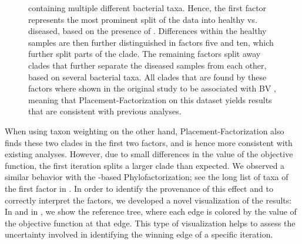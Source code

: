 \begin{figure}[!htbp]
{        containing multiple different bacterial taxa.
        Hence, the first factor represents the most prominent split of the data into healthy vs. diseased,
        based on the presence of .
        Differences within the healthy samples are then further distinguished in factors five and ten,
        which further split parts of the  clade.
        The remaining factors split away clades that further separate the diseased samples from each other,
        based on several bacterial taxa.
        All clades that are found by these factors
        where shown in the original study to be associated with \ac{BV} \cite{Srinivasan2012},
        meaning that Placement-Factorization on this dataset yields results that are consistent with previous analyses.
    }
    \label{fig:factors_tree}
\end{figure}

When using taxon weighting on the other hand, Placement-Factorization also finds these two clades in the first two factors,
and is hence more consistent with existing analyses.
However, due to small differences in the value of the objective function,
the first iteration splits a larger clade than expected.
We observed a similar behavior with the -based Phylofactorization;
see the long list of taxa of the first factor in .
In order to identify the provenance of this effect and to correctly interpret the factors,
we developed a novel visualization of the results:
In  and in , we show the reference tree,
where each edge is colored by the value of the objective function at that edge.
This type of visualization helps to assess the uncertainty involved in identifying the winning edge of a specific iteration.

